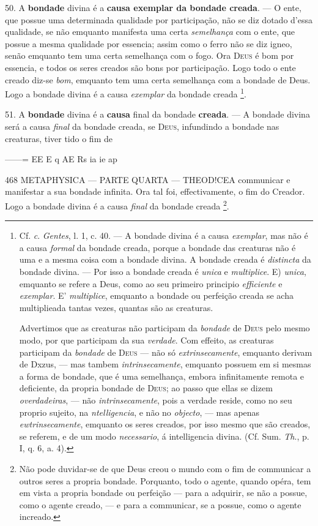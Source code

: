 50. A \textbf{bondade} divina é a \textbf{causa exemplar da bondade creada}. --- O ente, que possue uma determinada qualidade por participação, não se diz dotado d'essa qualidade, se não emquanto manifesta uma certa \emph{semelhança} com o ente, que possue a mesma qualidade por essencia; assim como o ferro não se diz igneo, senão emquanto tem uma certa semelhança com o fogo. Ora \textsc{Deus} é bom por essencia, e todos os seres creados são bons por participação. Logo todo o ente creado diz-se \emph{bom}, emquanto tem uma certa semelhança com a bondade de Deus. Logo a bondade divina é a causa \emph{exemplar} da bondade creada \footnote{Cf. \emph{c}. \emph{Gentes}, l. 1, c. 40. --- A bondade divina é a causa \emph{exemplar}, mas não é a causa \emph{formal} da bondade creada, porque a bondade das creaturas não é uma e a mesma coisa com a bondade divina. A bondade creada é \emph{distincta} da bondade divina. --- Por isso a bondade creada é \emph{unica} e \emph{multiplice}. E) \emph{unica}, emquanto se refere a Deus, como ao seu primeiro principio \emph{efficiente} e \emph{exemplar}. E' \emph{multiplice}, emquanto a bondade ou perfeição creada se acha multiplieada tantas vezes, quantas são as creaturas.\par Advertimos que as creaturas não participam da \emph{bondade} de \textsc{Deus} pelo mesmo modo, por que participam da sua \emph{verdade}. Com effeito, as creaturas participam da \emph{bondade} de \textsc{Deus} --- não só \emph{extrinsecamente}, emquanto derivam de Dxzus, --- mas tambem \emph{intrinsecamente}, emquanto possuem em si mesmas a forma de bondade, que é uma semelhança, embora infinitamente remota e deficiente, da propria bondade de \textsc{Deus}; ao passo que ellas se dizem \emph{overdadeiras}, --- não \emph{intrinsecamente}, pois a verdade reside, como no seu proprio sujeito, na \emph{ntelligencia}, e não no \emph{objecto}, --- mas apenas \emph{ewtrinsecamente}, emquanto os seres creados, por isso mesmo que são creados, se referem, e de um modo \emph{necessario}, á intelligencia divina. (Cf. Sum. \emph{Th}., p. I, q. 6, a. 4).}.

51. A \textbf{bondade} divina é a \textbf{causa} final da bondade \textbf{creada}. --- A bondade divina será a causa \emph{final} da bondade creada, se \textsc{Deus}, infundindo a bondade nas creaturas, tiver tido o fim de

 ------= EE E q AE Rs ia ie ap

468 METAPHYSICA --- PARTE QUARTA --- THEOD!CEA communicar e manifestar a sua bondade infinita. Ora tal foi, effectivamente, o fim do Creador. Logo a bondade divina é a causa \emph{final} da bondade creada \footnote{Não pode duvidar-se de que Deus creou o mundo com o fim de communicar a outros seres a propria bondade. Porquanto, todo o agente, quando opéra, tem em vista a propria bondade ou perfeição --- para a adquirir, se não a possue, como o agente creado, --- e para a communicar, se a possue, como o agente increado.}.

